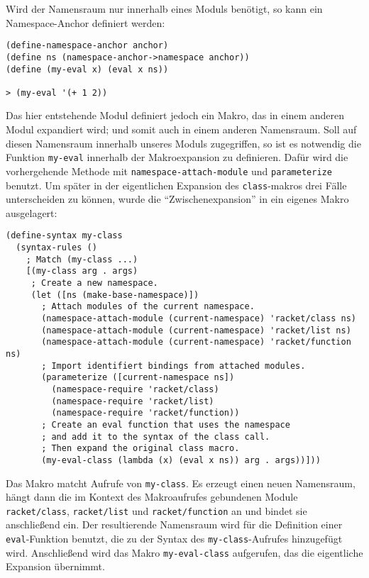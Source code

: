 Wird der Namensraum nur innerhalb eines Moduls benötigt, so kann ein Name\-space-An\-chor definiert werden:

\begin{lstlisting}
(define-namespace-anchor anchor)
(define ns (namespace-anchor->namespace anchor))
(define (my-eval x) (eval x ns))

> (my-eval '(+ 1 2))
\end{lstlisting}
{}

Das hier entstehende Modul definiert jedoch ein Makro, das in einem anderen Modul expandiert wird; und somit auch in einem anderen Namensraum. Soll auf diesen Namensraum innerhalb unseres Moduls zugegriffen, so ist es notwendig die Funktion \texttt{my-eval} innerhalb der Makroexpansion zu definieren. Dafür wird die vorhergehende Methode mit \texttt{namespace-attach-module} und \texttt{parameterize} benutzt. Um später in der eigentlichen Expansion des \texttt{class}-makros drei Fälle unterscheiden zu können, wurde die ``Zwischenexpansion'' in ein eigenes Makro ausgelagert:

\begin{lstlisting}
(define-syntax my-class
  (syntax-rules ()
    ; Match (my-class ...)
    [(my-class arg . args)
     ; Create a new namespace.
     (let ([ns (make-base-namespace)])
       ; Attach modules of the current namespace.
       (namespace-attach-module (current-namespace) 'racket/class ns)
       (namespace-attach-module (current-namespace) 'racket/list ns)
       (namespace-attach-module (current-namespace) 'racket/function ns)
       ; Import identifiert bindings from attached modules.
       (parameterize ([current-namespace ns])
         (namespace-require 'racket/class)
         (namespace-require 'racket/list)
         (namespace-require 'racket/function))
       ; Create an eval function that uses the namespace
       ; and add it to the syntax of the class call.
       ; Then expand the original class macro.
       (my-eval-class (lambda (x) (eval x ns)) arg . args))]))
\end{lstlisting}

Das Makro matcht Aufrufe von \texttt{my-class}. Es erzeugt einen neuen Namensraum, hängt dann die im Kontext des Makroaufrufes gebundenen Module \texttt{racket/class}, \texttt{racket/list} und \texttt{racket/function} an und bindet sie anschließend ein. Der resultierende Namensraum wird für die Definition einer \texttt{eval}-Funktion benutzt, die zu der Syntax des \texttt{my-class}-Aufrufes hinzugefügt wird. Anschließend wird das Makro \texttt{my-eval-class} aufgerufen, das die eigentliche Expansion übernimmt.

